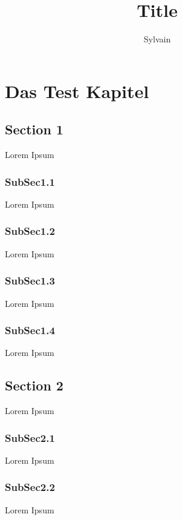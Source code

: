 \documentclass{report}
\title{Title}
\author{Sylvain}
\begin{document}
\maketitle

\tableofcontents

\chapter{Das Test Kapitel}
\section{Section 1}
Lorem Ipsum
\subsection{SubSec1.1}
Lorem Ipsum
\subsection{SubSec1.2}
Lorem Ipsum


\subsection{SubSec1.3}
Lorem Ipsum

\subsection{SubSec1.4}
Lorem Ipsum

\section{Section 2}
Lorem Ipsum

\subsection{SubSec2.1}
Lorem Ipsum

\subsection{SubSec2.2}
Lorem Ipsum
\end{document}
